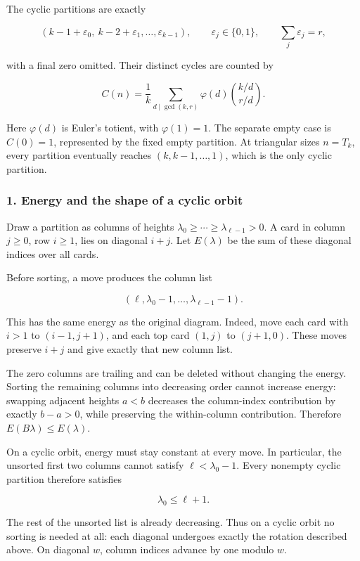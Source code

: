 \documentclass[11pt,a4paper]{article}
\begin{document}
The cyclic partitions are exactly

\[
(k-1+\varepsilon_0,\ k-2+\varepsilon_1,\ldots,\varepsilon_{k-1}),
\qquad \varepsilon_j\in\{0,1\},\qquad \sum_j\varepsilon_j=r,
\]

with a final zero omitted. Their distinct cycles are counted by

\[
\boxed{\displaystyle
C(n)=\frac1k\sum_{d\mid\gcd(k,r)}\varphi(d)
  \binom{k/d}{r/d}.}
\]

Here \(\varphi(d)\) is Euler's totient, with \(\varphi(1)=1\). The separate empty case is \(C(0)=1\), represented by the fixed empty partition. At triangular sizes \(n=T_k\), every partition eventually reaches \((k,k-1,\ldots,1)\), which is the only cyclic partition.

\subsubsection{1. Energy and the shape of a cyclic orbit}\label{energy-and-the-shape-of-a-cyclic-orbit}

Draw a partition as columns of heights \(\lambda_0\ge\cdots\ge\lambda_{\ell-1}>0\). A card in column \(j\ge0\), row \(i\ge1\), lies on diagonal \(i+j\). Let \(E(\lambda)\) be the sum of these diagonal indices over all cards.

Before sorting, a move produces the column list

\[
(\ell,\lambda_0-1,\ldots,\lambda_{\ell-1}-1).
\]

This has the same energy as the original diagram. Indeed, move each card with \(i>1\) to \((i-1,j+1)\), and each top card \((1,j)\) to \((j+1,0)\). These moves preserve \(i+j\) and give exactly that new column list.

The zero columns are trailing and can be deleted without changing the energy. Sorting the remaining columns into decreasing order cannot increase energy: swapping adjacent heights \(a<b\) decreases the column-index contribution by exactly \(b-a>0\), while preserving the within-column contribution. Therefore \(E(B\lambda)\le E(\lambda)\).

On a cyclic orbit, energy must stay constant at every move. In particular, the unsorted first two columns cannot satisfy \(\ell<\lambda_0-1\). Every nonempty cyclic partition therefore satisfies

\[
\lambda_0\le\ell+1.
\]

The rest of the unsorted list is already decreasing. Thus on a cyclic orbit no sorting is needed at all: each diagonal undergoes exactly the rotation described above. On diagonal \(w\), column indices advance by one modulo \(w\).
\end{document}
